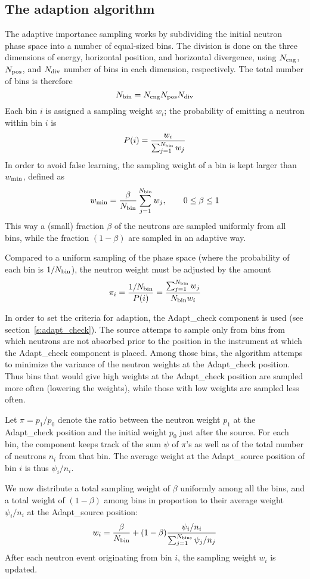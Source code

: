 \subsection{The adaption algorithm}

The adaptive importance sampling works by subdividing the initial
neutron phase space into a number of equal-sized bins. The division is
done on the three dimensions of energy, horizontal position, and
horizontal divergence, using $N_{\rm eng}$, $N_{\rm pos}$, and $N_{\rm
  div}$ number of bins in each dimension, respectively. The total number
of bins is therefore
$$
N_{\rm bin} = N_{\rm eng} N_{\rm pos} N_{\rm div}
$$
Each bin $i$ is assigned a sampling weight $w_i$; the probability of
emitting a neutron within bin $i$ is
$$
P(i) = \frac{w_i}{\sum_{j=1}^{N_{\rm bin}} w_j}
$$
In order to avoid false learning, the sampling weight of a bin is
kept larger than $w_{\rm min}$, defined as
$$
w_{\rm min} = \frac{\beta}{N_{\rm bin}}\sum_{j=1}^{N_{\rm bin}}w_j,\qquad
    0 \leq \beta \leq 1
$$
This way a (small) fraction $\beta$ of the neutrons are sampled
uniformly from all bins, while the fraction $(1 - \beta)$ are sampled in an adaptive way.

Compared to a uniform sampling of the phase space (where the probability
of each bin is $1/N_{\rm bin}$), the neutron weight
must be adjusted by the amount
$$
\pi_i = \frac{1/N_{\rm bin}}{P(i)} =
    \frac{\sum_{j=1}^{N_{\rm bin}} w_j}{N_{\rm bin} w_i}
$$

In order to set the criteria for adaption, the Adapt\_check component is
used (see section~\ref{s:adapt_check}). The source attemps to sample
only from bins from which neutrons are not absorbed prior to the
position in the instrument at which the Adapt\_check component is
placed. Among those bins, the algorithm attemps to minimize the variance
of the neutron weights at the Adapt\_check position. Thus bins that
would give high weights at the Adapt\_check position are sampled more
often (lowering the weights), while those with low weights are sampled
less often.

Let $\pi = p_1/p_0$ denote the ratio between the neutron weight $p_1$ at
the Adapt\_check position and the initial weight $p_0$ just after the
source. For each bin, the component keeps track of the sum $\psi$ of
$\pi$'s as well as of the total number of neutrons $n_i$ from that
bin. The average weight at the Adapt\_source position of bin $i$ is thus
$\psi_i/n_i$.

We now distribute a total sampling weight of $\beta$ uniformly
among all the bins, and a total weight of $(1 - \beta)$ among bins in
proportion to their average weight $\psi_i/n_i$ at the Adapt\_source
position:
$$
w_i = \frac{\beta}{N_{\rm bin}} +
    (1-\beta) \frac{\psi_i/n_i}{\sum_{j=1}^{N_{\rm bins}} \psi_j/n_j}
$$
After each neutron event originating from bin $i$, the sampling weight $w_i$
is updated.

